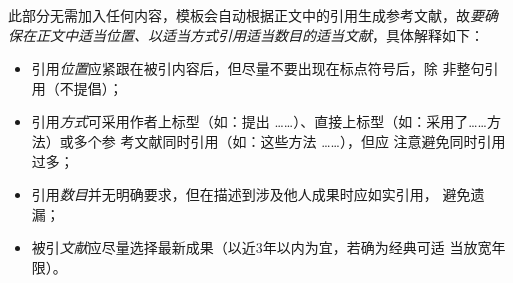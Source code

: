 \begin{tcolorbox}
	此部分无需加入任何内容，模板会自动根据正文中的引用生成参考文献，故\emph{要确
		保在正文中适当位置、以适当方式引用适当数目的适当文献}，具体解释如下：
	\begin{itemize}
		\item 引用\emph{位置}应紧跟在被引内容后，但尽量不要出现在标点符号后，除
		      非整句引用（不提倡）；
		\item 引用\emph{方式}可采用作者上标型（如：\citet{chen1980zhongguo}提出
		      ……）、直接上标型（如：采用了……方法\citep{chen2005zhulu}）或多个参
		      考文献同时引用（如：这些方法
		      \citep{Bohan1928,chu2004tushu,Dubrovin1906,hls2012jinji}……），但应
		      注意避免同时引用过多；
		\item 引用\emph{数目}并无明确要求，但在描述到涉及他人成果时应如实引用，
		      避免遗漏；
		\item 被引\emph{文献}应尽量选择最新成果（以近3年以内为宜，若确为经典可适
		      当放宽年限）。
	\end{itemize}
\end{tcolorbox}